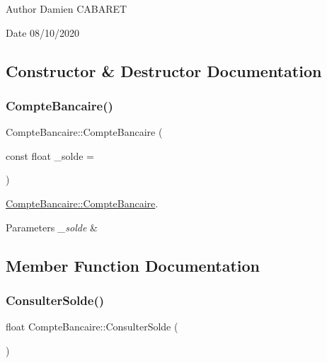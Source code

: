 \begin{DoxyAuthor}{Author}
Damien C\+A\+B\+A\+R\+ET 
\end{DoxyAuthor}
\begin{DoxyDate}{Date}
08/10/2020 
\end{DoxyDate}


\subsection{Constructor \& Destructor Documentation}
\mbox{\label{class_compte_bancaire_adfdd7a467ec100c22b395d74d1a5509d}} 
\subsubsection{\texorpdfstring{Compte\+Bancaire()}{CompteBancaire()}}
{\footnotesize\ttfamily Compte\+Bancaire\+::\+Compte\+Bancaire (\begin{DoxyParamCaption}\item[{const float}]{\+\_\+solde = {} }\end{DoxyParamCaption})}



\hyperlink{class_compte_bancaire_adfdd7a467ec100c22b395d74d1a5509d}{Compte\+Bancaire\+::\+Compte\+Bancaire}. 


\begin{DoxyParams}{Parameters}
{\em \+\_\+solde} & \\
\hline
\end{DoxyParams}


\subsection{Member Function Documentation}
\mbox{\label{class_compte_bancaire_a5caabd51cbde1a2ec3bedbf12db1c869}} 
\subsubsection{\texorpdfstring{Consulter\+Solde()}{ConsulterSolde()}}
{\footnotesize\ttfamily float Compte\+Bancaire\+::\+Consulter\+Solde (\begin{DoxyParamCaption}{ }\end{DoxyParamCaption})}

